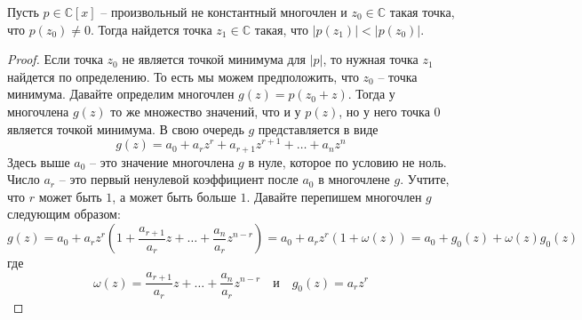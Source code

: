 \begin{claim}
\label{claim::PolyMinIsZero}
Пусть $p\in\mathbb C[x]$ -- произвольный не константный многочлен и $z_0\in \mathbb C$ такая точка, что $p(z_0)\neq 0$.
Тогда найдется точка $z_1\in \mathbb C$ такая, что $|p(z_1)|<|p(z_0)|$.
\end{claim}
\begin{proof}
Если точка $z_0$ не является точкой минимума для $|p|$, то нужная точка $z_1$ найдется по определению.
То есть мы можем предположить, что $z_0$ -- точка минимума.
Давайте определим многочлен $g(z) = p(z_0 + z)$.
Тогда у многочлена $g(z)$ то же множество значений, что и у $p(z)$, но у него точка $0$ является точкой минимума.
В свою очередь $g$ представляется в виде
\[
g(z) = a_0 + a_r z^r + a_{r+1}z^{r+1} + \ldots + a_n z^n
\]
Здесь выше $a_0$ -- это значение многочлена $g$ в нуле, которое по условию не ноль.
Число $a_r$ -- это первый ненулевой коэффициент после $a_0$ в многочлене $g$.
Учтите, что $r$ может быть $1$, а может быть больше $1$.
Давайте перепишем многочлен $g$ следующим образом:
\[
g(z) = a_0 + a_r z^r\left(1 + \frac{a_{r+1}}{a_r}z + \ldots + \frac{a_n}{a_r} z^{n-r}\right) = a_0 + a_r z^r\left(1 + \omega(z) \right) = a_0 + g_0(z) + \omega(z) g_0(z)
\]
где
\[
\omega(z) =  \frac{a_{r+1}}{a_r}z + \ldots + \frac{a_n}{a_r} z^{n-r}\quad \text{и} \quad g_0(z) = a_rz^r
\]


\end{proof}
